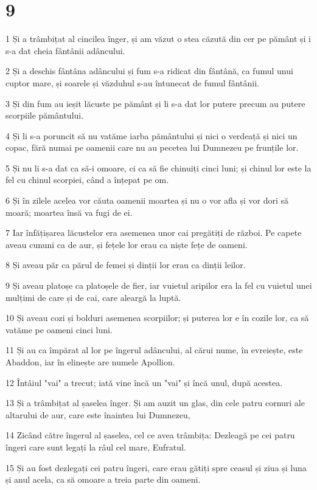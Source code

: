 \chapter{9}

\par 1 Și a trâmbițat al cincilea înger, și am văzut o stea căzută din cer pe pământ și i s-a dat cheia fântânii adâncului.
\par 2 Și a deschis fântâna adâncului și fum s-a ridicat din fântână, ca fumul unui cuptor mare, și soarele și văzduhul s-au întunecat de fumul fântânii.
\par 3 Și din fum au ieșit lăcuste pe pământ și li s-a dat lor putere precum au putere scorpiile pământului.
\par 4 Și li s-a poruncit să nu vatăme iarba pământului și nici o verdeață și nici un copac, fără numai pe oamenii care nu au pecetea lui Dumnezeu pe frunțile lor.
\par 5 Și nu li s-a dat ca să-i omoare, ci ca să fie chinuiți cinci luni; și chinul lor este la fel cu chinul scorpiei, când a înțepat pe om.
\par 6 Și în zilele acelea vor căuta oamenii moartea și nu o vor afla și vor dori să moară; moartea însă va fugi de ei.
\par 7 Iar înfățișarea lăcustelor era asemenea unor cai pregătiți de război. Pe capete aveau cununi ca de aur, și fețele lor erau ca niște fețe de oameni.
\par 8 Și aveau păr ca părul de femei și dinții lor erau ca dinții leilor.
\par 9 Și aveau platoșe ca platoșele de fier, iar vuietul aripilor era la fel cu vuietul unei mulțimi de care și de cai, care aleargă la luptă.
\par 10 Și aveau cozi și bolduri asemenea scorpiilor; și puterea lor e în cozile lor, ca să vatăme pe oameni cinci luni.
\par 11 Și au ca împărat al lor pe îngerul adâncului, al cărui nume, în evreiește, este Abaddon, iar în elinește are numele Apollion.
\par 12 Întâiul "vai" a trecut; iată vine încă un "vai" și încă unul, după acestea.
\par 13 Și a trâmbițat al șaselea înger. Și am auzit un glas, din cele patru cornuri ale altarului de aur, care este înaintea lui Dumnezeu,
\par 14 Zicând către îngerul al șaselea, cel ce avea trâmbița: Dezleagă pe cei patru îngeri care sunt legați la râul cel mare, Eufratul.
\par 15 Și au fost dezlegați cei patru îngeri, care erau gătiți spre ceasul și ziua și luna și anul acela, ca să omoare a treia parte din oameni.
